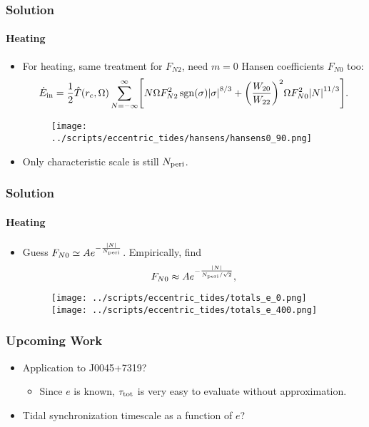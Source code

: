 \documentclass[dvipsnames,8pt]{beamer}
\DeclareMathOperator{\sgn}{sgn}
\DeclarePairedDelimiter\abs{\lvert}{\rvert}
\DeclarePairedDelimiter\p{\lparen}{\rparen}
\DeclarePairedDelimiter\s{\lbrack}{\rbrack}
\begin{document}
\begin{frame}
    \frametitle{Solution}
    \framesubtitle{Heating}

    \begin{itemize}
        \item For heating, same treatment for $F_{N2}$, need $m = 0$ Hansen
            coefficients $F_{N0}$ too:
        \begin{align}
             \dot{E}_{\rm in} = \frac{1}{2}\hat{T}\p*{r_c, \Omega}
                 \sum\limits_{N = -\infty}^\infty\s*{
                    N\Omega F_{N2}^2 \sgn \p*{\sigma} \abs*{\sigma}^{8/3}
                    + \p*{\frac{W_{20}}{W_{22}}}^2\Omega F_{N0}^2 \abs*{N}^{11/3}}.
                    \label{eq:e_sum}
        \end{align}
        \begin{figure}[h]
            \centering
            \texttt{[image: ../scripts/eccentric\_tides/hansens/hansens0\_90.png]}
        \end{figure}

        \item Only characteristic scale is still $N_{\rm peri}$.
    \end{itemize}
\end{frame}

\begin{frame}
    \frametitle{Solution}
    \framesubtitle{Heating}

    \begin{itemize}
        \item Guess $F_{N0} \simeq Ae^{-\frac{\abs{N}}{N_{\rm peri}}}$.
            Empirically, find
            \begin{equation}
                F_{N0} \approx Ae^{-\frac{\abs{N}}{N_{\rm peri}/\sqrt{2}}},
            \end{equation}

        \begin{figure}[t]
            \centering
            \texttt{[image: ../scripts/eccentric\_tides/totals\_e\_0.png]}
            \texttt{[image: ../scripts/eccentric\_tides/totals\_e\_400.png]}
        \end{figure}
    \end{itemize}
\end{frame}

\begin{frame}
    \frametitle{Upcoming Work}

    \begin{itemize}
        \item Application to J0045+7319?
        \begin{itemize}
            \item Since $e$ is known, $\tau_{\rm tot}$ is very easy to evaluate
                without approximation.
        \end{itemize}

        \item Tidal synchronization timescale as a function of $e$?
    \end{itemize}
\end{frame}
\end{document}
